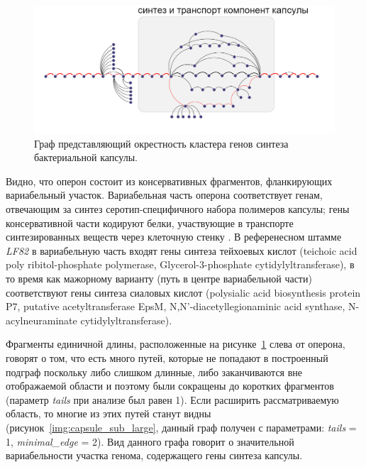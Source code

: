 \begin{figure}[!ht] 
  \center
    \includegraphics[width=\textwidth]{Dissertation/images/subgraphs/capsular_subgraph.png}
  \caption{Граф представляющий окрестность кластера генов синтеза бактериальной капсулы. }
  \label{img:capsule_sub_small} 
\end{figure}

Видно, что оперон состоит из консервативных фрагментов, фланкирующих вариабельный участок. Вариабельная часть оперона соответствует генам, отвечающим за синтез серотип-специфичного набора полимеров капсулы; гены консервативной части кодируют белки, участвующие в транспорте синтезированных веществ через клеточную стенку \cite{clarke1999genetic}. В референесном штамме \textit{LF82} в вариабельную часть входят гены синтеза тейхоевых кислот (teichoic acid poly ribitol-phosphate polymerase, Glycerol-3-phosphate cytidylyltransferase), в то время как мажорному варианту (путь в центре вариабельной части) соответствуют гены синтеза сиаловых кислот (polysialic acid biosynthesis protein P7, putative acetyltransferase EpsM, N,N'-diacetyllegionaminic acid synthase, N-acylneuraminate cytidylyltransferase).


Фрагменты единичной длины, расположенные на рисунке~\ref{img:capsule_sub_small} слева от оперона, говорят о том, что есть много путей, которые не попадают в построенный подграф поскольку либо слишком длинные, либо заканчиваются вне отображаемой области и поэтому были сокращены до коротких фрагментов (параметр \textit{tails} при анализе был равен 1). Если расширить рассматриваемую область, то многие из этих путей станут видны (рисунок~\ref{img:capsule_sub_large}, данный граф получен с параметрами: \textit{tails} = 1, \textit{minimal\_edge} = 2). Вид данного графа говорит о значительной вариабельности участка генома, содержащего гены синтеза капсулы.

